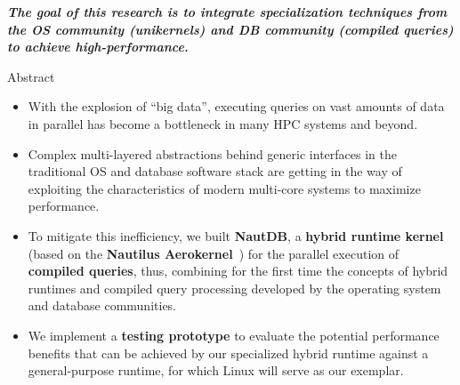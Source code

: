 
\begin{mybox}
    \textbf{\emph{The goal of this research is to integrate specialization techniques from the OS community
      (unikernels) and  DB community (compiled queries) to achieve high-performance.}}
\end{mybox}

\begin{block}{Abstract}
  \begin{itemize}
  \item   With the explosion of ``big data'', executing queries on vast amounts of data in parallel has become a bottleneck in many HPC systems and beyond.
  \item   Complex multi-layered abstractions behind generic interfaces in the traditional OS and database software stack are getting in the way of exploiting the characteristics of modern multi-core systems to maximize performance.
  \item   To mitigate this inefficiency, we built \textbf{NautDB}, a \textbf{hybrid runtime kernel} (based on the \textbf{Nautilus Aerokernel}~\cite{HALE:2015:NAUTILUS}) for the parallel execution of \textbf{compiled queries}, thus, combining for the first time the concepts of hybrid runtimes and compiled query processing developed by the operating system and database communities.
  \item   We implement a \textbf{testing prototype} to evaluate the potential performance benefits that can be achieved by our specialized hybrid runtime against a general-purpose runtime, for which Linux will serve as our exemplar.
  \end{itemize}
\end{block}


